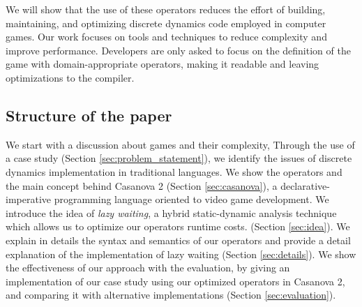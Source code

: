 We will show that the use of these operators reduces the effort of building, maintaining, and optimizing discrete dynamics code employed in computer games. Our work focuses on tools and techniques to reduce complexity and improve performance. Developers are only asked to focus on the definition of the game with domain-appropriate operators, making it readable and leaving optimizations to the compiler.

\subsection{Structure of the paper}
We start with a discussion about games and their complexity, Through the use of a case study (Section \ref{sec:problem_statement}), we identify the issues of discrete dynamics implementation in traditional languages. We show the operators and the main concept behind Casanova 2 (Section \ref{sec:casanova}), a declarative-imperative programming language oriented to video game development. We introduce the idea of \emph{lazy waiting}, a hybrid static-dynamic analysis technique which allows us to optimize our operators runtime costs. (Section \ref{sec:idea}). We explain in details the syntax and semantics of our operators and provide a detail explanation of the implementation of lazy waiting (Section \ref{sec:details}). We show the effectiveness of our approach with the evaluation, by giving an implementation of our case study using our optimized operators in Casanova 2, and comparing it with alternative implementations (Section \ref{sec:evaluation}).